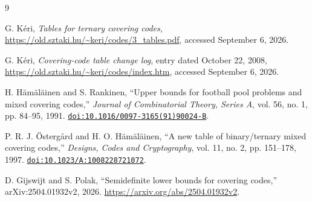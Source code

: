 \documentclass[11pt]{article}
\begin{document}
\begin{thebibliography}{9}

G. K\'eri,
\emph{Tables for ternary covering codes},
\url{https://old.sztaki.hu/~keri/codes/3_tables.pdf},
accessed September 6, 2026.

G. K\'eri,
\emph{Covering-code table change log},
entry dated October 22, 2008,
\url{https://old.sztaki.hu/~keri/codes/index.htm},
accessed September 6, 2026.

H. H\"am\"al\"ainen and S. Rankinen,
``Upper bounds for football pool problems and mixed covering codes,''
\emph{Journal of Combinatorial Theory, Series A},
vol. 56, no. 1, pp. 84--95, 1991.
\href{https://doi.org/10.1016/0097-3165(91)90024-B}
     {\texttt{doi:10.1016/0097-3165(91)90024-B}}.

P. R. J. \"Osterg{\aa}rd and H. O. H\"am\"al\"ainen,
``A new table of binary/ternary mixed covering codes,''
\emph{Designs, Codes and Cryptography},
vol. 11, no. 2, pp. 151--178, 1997.
\href{https://doi.org/10.1023/A:1008228721072}
     {\texttt{doi:10.1023/A:1008228721072}}.

D. Gijswijt and S. Polak,
``Semidefinite lower bounds for covering codes,''
arXiv:2504.01932v2, 2026.
\url{https://arxiv.org/abs/2504.01932v2}.

\end{thebibliography}
\end{document}
